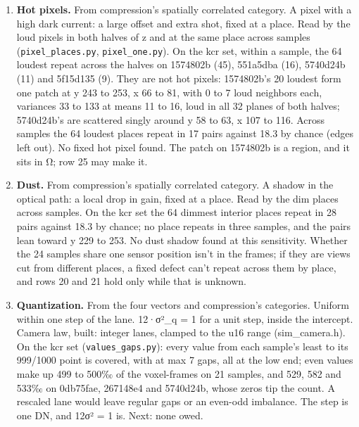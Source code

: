 \begin{enumerate}
\begin{itemize}
\item Prior art, cited from knowledge. DSNU and PRNU as the spatial variance of the dark and of the gain, read from frame averages at several levels: EMVA Standard 1288, “Standard for Characterization of Image Sensors and Cameras”, European Machine Vision Association (rows 18 and 19).
\end{itemize}
\item \textbf{Hot pixels.} From compression's spatially correlated category. A pixel with a high dark current: a large offset and extra shot, fixed at a place. Read by the loud pixels in both halves of z and at the same place across samples (\texttt{pixel\_\allowbreak{}places.\allowbreak{}py}, \texttt{pixel\_\allowbreak{}one.\allowbreak{}py}). On the kcr set, within a sample, the 64 loudest repeat across the halves on 1574802b (45), 551a5dba (16), 5740d24b (11) and 5f15d135 (9). They are not hot pixels: 1574802b's 20 loudest form one patch at y 243 to 253, x 66 to 81, with 0 to 7 loud neighbors each, variances 33 to 133 at means 11 to 16, loud in all 32 planes of both halves; 5740d24b's are scattered singly around y 58 to 63, x 107 to 116. Across samples the 64 loudest places repeat in 17 pairs against 18.3 by chance (edges left out). No fixed hot pixel found. The patch on 1574802b is a region, and it sits in Ω; row 25 may make it.
\item \textbf{Dust.} From compression's spatially correlated category. A shadow in the optical path: a local drop in gain, fixed at a place. Read by the dim places across samples. On the kcr set the 64 dimmest interior places repeat in 28 pairs against 18.3 by chance; no place repeats in three samples, and the pairs lean toward y 229 to 253. No dust shadow found at this sensitivity. Whether the 24 samples share one sensor position isn't in the frames; if they are views cut from different places, a fixed defect can't repeat across them by place, and rows 20 and 21 hold only while that is unknown.
\item \textbf{Quantization.} From the four vectors and compression's categories. Uniform within one step of the lane. 12·σ²\_\allowbreak{}q = 1 for a unit step, inside the intercept. Camera law, built: integer lanes, clamped to the u16 range (sim\_\allowbreak{}camera.h). On the kcr set (\texttt{values\_\allowbreak{}gaps.\allowbreak{}py}): every value from each sample's least to its 999/1000 point is covered, with at max 7 gaps, all at the low end; even values make up 499 to 500‰ of the voxel-frames on 21 samples, and 529, 582 and 533‰ on 0db75fae, 267148e4 and 5740d24b, whose zeros tip the count. A rescaled lane would leave regular gaps or an even-odd imbalance. The step is one DN, and 12σ² = 1 is. Next: none owed.

\end{enumerate}
